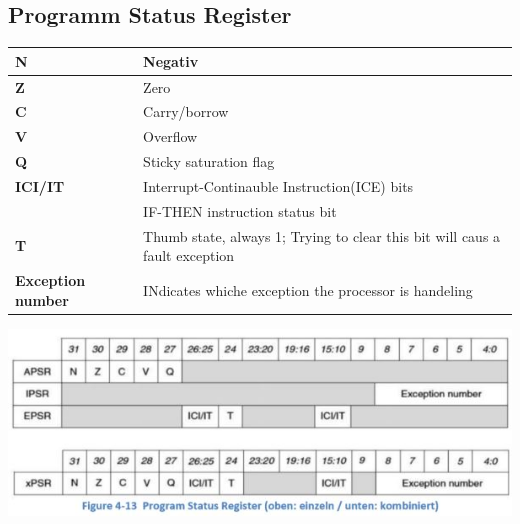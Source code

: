 \subsection{Programm Status Register}
\begin{minipage}{\linewidth}
    \begin{tabular}{|l|l|}
        \hline 
        \textbf{N}& Negativ \\ 
        \hline 
        \textbf{Z}& Zero  \\ 
        \hline 
        \textbf{C}& Carry/borrow  \\ 
        \hline 
        \textbf{V}& Overflow \\ 
        \hline 
        \textbf{Q}& Sticky saturation flag \\ 
        \hline 
        \textbf{ICI/IT}& Interrupt-Continauble Instruction(ICE) bits\\
                        & IF-THEN instruction status bit \\ 
        \hline 
        \textbf{T}& Thumb state, always 1; Trying to clear this bit will caus a fault exception \\ 
        \hline 
        \textbf{Exception number}& INdicates whiche exception the processor is handeling \\ 
        \hline 
    \end{tabular} 
\end{minipage}

\includegraphics[width=17cm]{images/programstatusregister}
\clearpage

